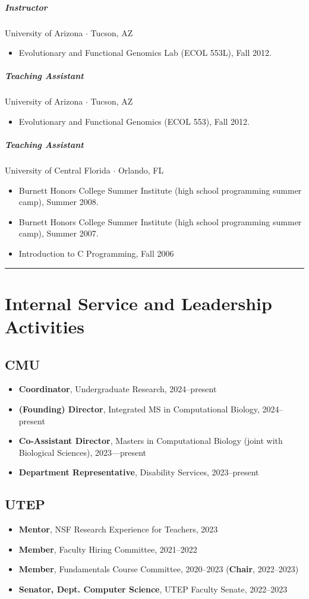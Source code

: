 \documentclass[10pt,letterpaper]{article}
\newcommand{\bigdot}{$\cdot$\xspace}
\newcommand{\cvsection}[1]{%
    \par\vspace{10pt}%
  \noindent\rule{\linewidth}{0.4pt}\par
  \vspace{-5.5ex}%
  \section*{#1}%
}
\begin{document}
\subparagraph{Instructor} University of Arizona \bigdot Tucson, AZ
\begin{itemize}
    \item Evolutionary and Functional Genomics Lab (ECOL 553L), Fall 2012.
\end{itemize}

\subparagraph{Teaching Assistant}
University of Arizona \bigdot Tucson, AZ
\begin{itemize}
    \item Evolutionary and Functional Genomics (ECOL 553), Fall 2012.
\end{itemize}

\subparagraph{Teaching Assistant}
University of Central Florida \bigdot Orlando, FL
\begin{itemize}
    \item Burnett Honors College Summer Institute (high school programming summer camp), Summer 2008.
    \item Burnett Honors College Summer Institute (high school programming summer camp), Summer 2007.
    \item Introduction to C Programming, Fall 2006
\end{itemize}

\cvsection{Internal Service and Leadership Activities}
\subsection*{CMU}
  \begin{itemize}
    \item \textbf{Coordinator}, Undergraduate Research, 2024--present
    \item \textbf{(Founding) Director}, Integrated MS in Computational Biology, 2024--present
    \item \textbf{Co-Assistant Director}, Masters in Computational Biology (joint with Biological Sciences), 2023---present
    \item \textbf{Department Representative}, Disability Services, 2023--present
  \end{itemize}
\subsection*{UTEP}
  \begin{itemize}
    \item \textbf{Mentor}, NSF Research Experience for Teachers, 2023
    \item \textbf{Member}, Faculty Hiring Committee, 2021--2022
    \item \textbf{Member}, Fundamentals Course Committee, 2020--2023 (\textbf{Chair}, 2022--2023)
    \item \textbf{Senator, Dept. Computer Science}, UTEP Faculty Senate, 2022--2023
    
  \end{itemize}
\end{document}
